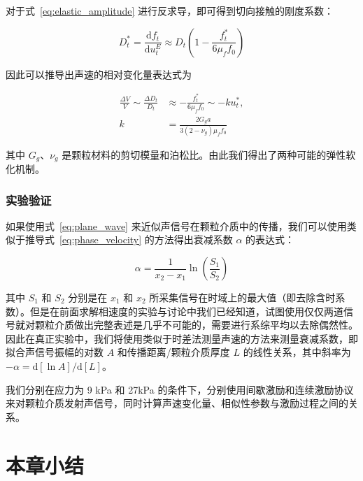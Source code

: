 对于式~\eqref{eq:elastic_amplitude} 进行反求导，即可得到切向接触的刚度系数：

\begin{equation}
  D_{t}^{*} = \frac{\mathrm{d}f_{t}}{\mathrm{d}u_{t}^{E}} \approx D_{t}\left(1 - \frac{f_{t}^{*}}{6\mu_{f} f_{0}}\right)
\end{equation}

因此可以推导出声速的相对变化量表达式为

\begin{align}
  \frac{\Delta V}{V}\sim \frac{\Delta D_{t}}{D_{t}} &\approx -\frac{f_{t}^{*}}{6\mu_{f} f_{0}} \sim -ku_{t}^{*},\\
  k &= \frac{2G_{g}a}{3(2-\nu_{g})\mu_{f} f_{0}}\label{eq:friction}
\end{align}

其中 $G_{g}$、$\nu_{g}$ 是颗粒材料的剪切模量和泊松比。由此我们得出了两种可能的弹性软化机制。

\subsubsection{实验验证}

如果使用式~\eqref{eq:plane_wave} 来近似声信号在颗粒介质中的传播，我们可以使用类似于推导式~\eqref{eq:phase_velocity} 的方法得出衰减系数 $\alpha$ 的表达式：

\begin{equation}
  \alpha = \frac{1}{x_{2}-x_{1}}\ln{\left(\frac{S_{1}}{S_{2}}\right)}
\end{equation}

其中 $S_{1}$ 和 $S_{2}$ 分别是在 $x_{1}$ 和 $x_{2}$ 所采集信号在时域上的最大值（即去除含时系数）。但是在前面求解相速度的实验与讨论中我们已经知道，试图使用仅仅两道信号就对颗粒介质做出完整表述是几乎不可能的，需要进行系综平均以去除偶然性。因此在真正实验中，我们将使用类似于时差法测量声速的方法来测量衰减系数，即拟合声信号振幅的对数 $A$ 和传播距离/颗粒介质厚度 $L$ 的线性关系，其中斜率为 $-\alpha = \mathrm{d}[\ln{A}]/\mathrm{d}[L]$。

我们分别在应力为 9 \unit{\kilo\pascal} 和 27\unit{\kilo\pascal} 的条件下，分别使用间歇激励和连续激励协议来对颗粒介质发射声信号，同时计算声速变化量、相似性参数与激励过程之间的关系。



\section{本章小结}